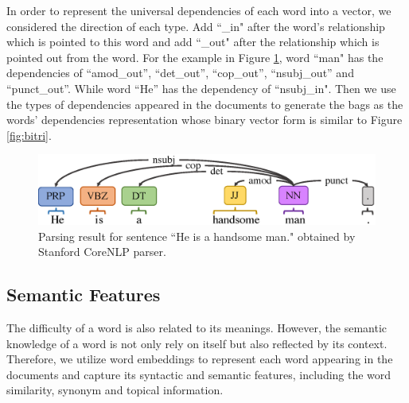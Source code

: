 In order to represent the universal dependencies of each word into a vector, we considered the direction of each type.
Add ``\_in" after the word's relationship which is pointed to this word and add ``\_out" after the relationship which is pointed out from the word.
For the example in Figure \ref{fig:parser}, 
word ``man" has the dependencies of ``amod\_out'', ``det\_out'', ``cop\_out'', ``nsubj\_out'' and ``punct\_out''.
While word ``He'' has the dependency of ``nsubj\_in".
Then we use the types of dependencies appeared in the documents to generate the bags as the words' dependencies representation whose binary vector form is similar to Figure \ref{fig:bitri}.
\begin{figure}[th]
	\centering
	\includegraphics[width=1\linewidth]{pic/parsing.eps} 
	\vspace{-0.25cm}
	\caption{Parsing result for sentence ``He is a handsome man." obtained by Stanford CoreNLP parser.}
	\label{fig:parser}
\end{figure}

\subsection{Semantic Features}
The difficulty of a word is also related to its meanings.
However, the semantic knowledge of a word is not only rely on itself but also reflected by its context. 
Therefore, we utilize word embeddings to represent each word appearing in the documents and capture its syntactic and semantic features, including the word similarity, synonym and topical information.


